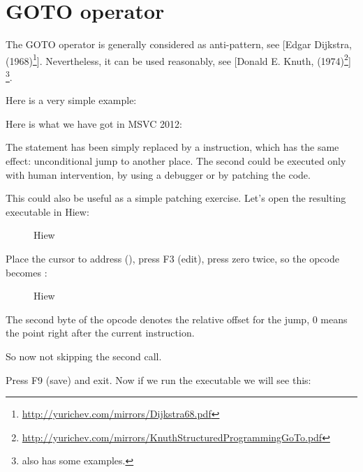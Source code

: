 \section{GOTO operator}

The GOTO operator is generally considered as anti-pattern, see
[Edgar Dijkstra,  (1968)\footnote{\url{http://yurichev.com/mirrors/Dijkstra68.pdf}}].
Nevertheless, it can be used reasonably, see 
[Donald E. Knuth,  (1974)\footnote{\url{http://yurichev.com/mirrors/KnuthStructuredProgrammingGoTo.pdf}}]
\footnote{\InSqBrackets{\CNotes} also has some examples.}.

Here is a very simple example:



Here is what we have got in MSVC 2012:



The  statement has been simply replaced by a \JMP instruction, which has the same effect: unconditional jump to another place.
The second \printf could be executed only with human intervention, by using a debugger or by patching the code.

\par

\clearpage

This could also be useful as a simple patching exercise. Let's open the resulting executable in Hiew:

\begin{figure}[H]
\centering
{}
\caption{Hiew}
\label{fig:goto_hiew1}
\end{figure}

\clearpage
Place the cursor to address \JMP (), 
press F3 (edit), press zero twice, so the opcode becomes :

\begin{figure}[H]
\centering
{}
\caption{Hiew}
\label{fig:goto_hiew2}
\end{figure}

The second byte of the \JMP opcode denotes the relative offset for the jump, 0 means the point
right after the current instruction.

So now \JMP not skipping the second \printf call.

Press F9 (save) and exit.  Now if we run the executable we will see this:

